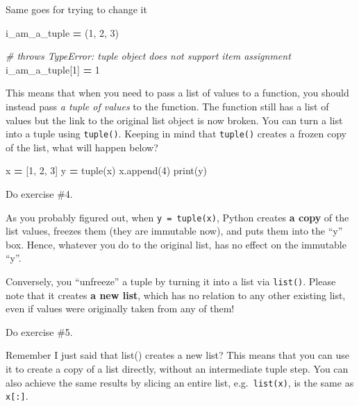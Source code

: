 \documentclass[
]{book}
\newenvironment{Shaded}{\begin{snugshade}}{\end{snugshade}}
\newcommand{\BuiltInTok}[1]{#1}
\newcommand{\CommentTok}[1]{\textcolor[rgb]{0.56,0.35,0.01}{\textit{#1}}}
\newcommand{\DecValTok}[1]{\textcolor[rgb]{0.00,0.00,0.81}{#1}}
\newcommand{\NormalTok}[1]{#1}
\newcommand{\OperatorTok}[1]{\textcolor[rgb]{0.81,0.36,0.00}{\textbf{#1}}}
\begin{document}
Same goes for trying to change it

\begin{Shaded}
\begin{Highlighting}[]
\NormalTok{i\_am\_a\_tuple }\OperatorTok{=}\NormalTok{ (}\DecValTok{1}\NormalTok{, }\DecValTok{2}\NormalTok{, }\DecValTok{3}\NormalTok{)}

\CommentTok{\# throws TypeError: \textquotesingle{}tuple\textquotesingle{} object does not support item assignment}
\NormalTok{i\_am\_a\_tuple[}\DecValTok{1}\NormalTok{] }\OperatorTok{=} \DecValTok{1} 
\end{Highlighting}
\end{Shaded}

This means that when you need to pass a list of values to a function, you should instead pass \emph{a tuple of values} to the function. The function still has a list of values but the link to the original list object is now broken. You can turn a list into a tuple using \texttt{tuple()}. Keeping in mind that \texttt{tuple()} creates a frozen copy of the list, what will happen below?

\begin{Shaded}
\begin{Highlighting}[]
\NormalTok{x }\OperatorTok{=}\NormalTok{ [}\DecValTok{1}\NormalTok{, }\DecValTok{2}\NormalTok{, }\DecValTok{3}\NormalTok{]}
\NormalTok{y }\OperatorTok{=} \BuiltInTok{tuple}\NormalTok{(x)}
\NormalTok{x.append(}\DecValTok{4}\NormalTok{)}
\BuiltInTok{print}\NormalTok{(y)}
\end{Highlighting}
\end{Shaded}

Do exercise \#4.

As you probably figured out, when \texttt{y\ =\ tuple(x)}, Python creates \textbf{a copy} of the list values, freezes them (they are immutable now), and puts them into the ``y'' box. Hence, whatever you do to the original list, has no effect on the immutable ``y''.

Conversely, you ``unfreeze'' a tuple by turning it into a list via \texttt{list()}. Please note that it creates \textbf{a new list}, which has no relation to any other existing list, even if values were originally taken from any of them!

Do exercise \#5.

Remember I just said that list() creates a new list? This means that you can use it to create a copy of a list directly, without an intermediate tuple step. You can also achieve the same results by slicing an entire list, e.g.~\texttt{list(x)}, is the same as \texttt{x{[}:{]}}.
\end{document}
